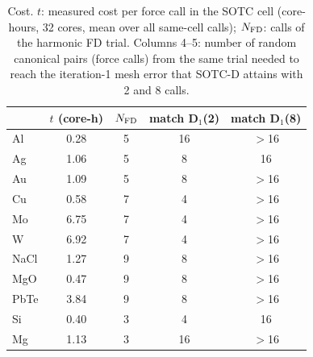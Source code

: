 \begin{table}[t]
\caption{Cost. $t$: measured cost per force call in the SOTC cell (core-hours, 32 cores, mean over all same-cell calls); $N_{\rm FD}$: calls of the harmonic FD trial. Columns 4--5: number of random canonical pairs (force calls) from the same trial needed to reach the iteration-1 mesh error that SOTC-D attains with 2 and 8 calls.}
\label{tab:cost}
\begin{ruledtabular}
\begin{tabular}{lcccc}
 & $t$ (core-h) & $N_{\rm FD}$ & match D$_1$(2) & match D$_1$(8)\\
\hline
Al & 0.28 & 5 & 16 & $>$16\\
Ag & 1.06 & 5 & 8 & 16\\
Au & 1.09 & 5 & 8 & $>$16\\
Cu & 0.58 & 7 & 4 & $>$16\\
Mo & 6.75 & 7 & 4 & $>$16\\
W & 6.92 & 7 & 4 & $>$16\\
NaCl & 1.27 & 9 & 8 & $>$16\\
MgO & 0.47 & 9 & 8 & $>$16\\
PbTe & 3.84 & 9 & 8 & $>$16\\
Si & 0.40 & 3 & 4 & 16\\
Mg & 1.13 & 3 & 16 & $>$16\\
\end{tabular}
\end{ruledtabular}
\end{table}
